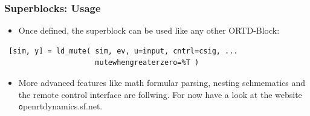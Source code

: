 \documentclass[serif,9pt,xcolor=dvipsnames]{beamer}
\begin{document}
\begin{frame}[fragile]
 \frametitle{Superblocks: Usage}
 
 \begin{itemize}
  \item Once defined, the superblock can be used like any other ORTD-Block:
 \end{itemize}

 
 {\small 
\begin{lstlisting} 
 [sim, y] = ld_mute( sim, ev, u=input, cntrl=csig, ...
                     mutewhengreaterzero=%T ) 
\end{lstlisting}}


 
\end{frame}


\begin{frame}

\begin{itemize}
 \item More advanced features like math formular parsing, nesting schmematics and the remote control interface are follwing. For now have a look at the website {\texttt openrtdynamics.sf.net}.
\end{itemize}

\end{frame}
\end{document}
